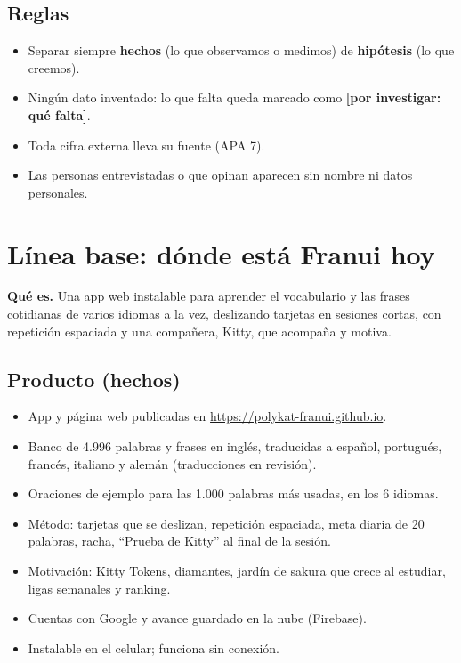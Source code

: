 \documentclass[11pt,a4paper]{article}
\newcommand{\porinvestigar}[1]{\textcolor{carmesi}{\textbf{[por investigar: #1]}}}
\begin{document}
\subsection*{Reglas}
\begin{itemize}
  \item Separar siempre \textbf{hechos} (lo que observamos o medimos) de \textbf{hipótesis} (lo que creemos).
  \item Ningún dato inventado: lo que falta queda marcado como \porinvestigar{qué falta}.
  \item Toda cifra externa lleva su fuente (APA 7).
  \item Las personas entrevistadas o que opinan aparecen sin nombre ni datos personales.
\end{itemize}

\clearpage
\section{Línea base: dónde está Franui hoy}
\par\medskip

\begin{idea}
\textbf{Qué es.} Una app web instalable para aprender el vocabulario y las frases cotidianas de varios
idiomas a la vez, deslizando tarjetas en sesiones cortas, con repetición espaciada y una compañera,
Kitty, que acompaña y motiva.
\end{idea}

\subsection*{Producto (hechos)}
\begin{itemize}
  \item App y página web publicadas en \url{https://polykat-franui.github.io}.
  \item Banco de 4.996 palabras y frases en inglés, traducidas a español, portugués, francés, italiano
        y alemán (traducciones en revisión).
  \item Oraciones de ejemplo para las 1.000 palabras más usadas, en los 6 idiomas.
  \item Método: tarjetas que se deslizan, repetición espaciada, meta diaria de 20 palabras, racha,
        \enquote{Prueba de Kitty} al final de la sesión.
  \item Motivación: Kitty Tokens, diamantes, jardín de sakura que crece al estudiar, ligas semanales y ranking.
  \item Cuentas con Google y avance guardado en la nube (Firebase).
  \item Instalable en el celular; funciona sin conexión.
\end{itemize}
\end{document}
